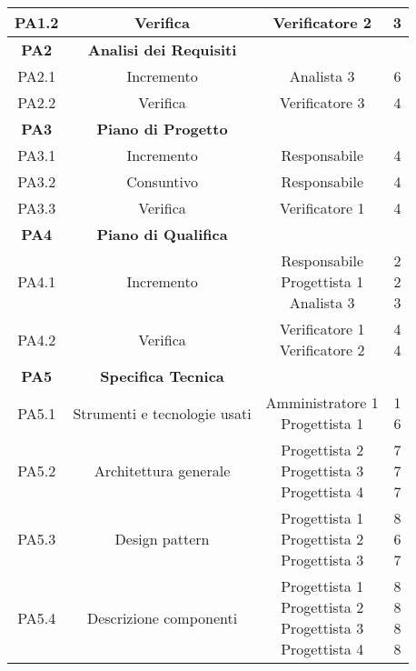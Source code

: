 \documentclass{scalatekids-article}
\begin{document}
\begin{center}
\begin{tabular}{| c | c | c | c |}
    \hline
    PA1.2 & Verifica & Verificatore 2 & 3\\
    \hline
    \textbf{PA2} & \textbf{Analisi dei Requisiti} & &\\
    \hline
    PA2.1 & Incremento & Analista 3 & 6\\
    \hline
    PA2.2 & Verifica & Verificatore 3 & 4\\
    \hline
    \textbf{PA3} & \textbf{Piano di Progetto} & &\\
    PA3.1 & Incremento & Responsabile & 4\\
    \hline
    PA3.2 & Consuntivo & Responsabile & 4\\
    \hline
    PA3.3 & Verifica & Verificatore 1 & 4\\
    \hline
    \textbf{PA4} & \textbf{Piano di Qualifica} & &\\
    \hline
    PA4.1 & Incremento & \multiLineCell[t]{Responsabile\\Progettista 1\\Analista 3} & \multiLineCell[t]{2\\2\\3}\\
    \hline
    PA4.2 & Verifica & \multiLineCell[t]{Verificatore 1\\Verificatore 2} & \multiLineCell[t]{4\\4}\\
    \hline
    \textbf{PA5} & \textbf{Specifica Tecnica} & &\\
    \hline
    PA5.1 & Strumenti e tecnologie usati & \multiLineCell[t]{Amministratore 1\\Progettista 1} & \multiLineCell[t]{1\\6}\\
    \hline
    PA5.2 & Architettura generale & \multiLineCell[t]{Progettista 2\\Progettista 3\\Progettista 4} & \multiLineCell[t]{7\\7\\7}\\
    \hline
    PA5.3 & Design pattern & \multiLineCell[t]{Progettista 1\\Progettista 2\\Progettista 3} & \multiLineCell[t]{8\\6\\7}\\
    \hline
    PA5.4 & Descrizione componenti & \multiLineCell[t]{Progettista 1\\Progettista 2\\Progettista 3\\Progettista 4} & \multiLineCell[t]{8\\8\\8\\8}\\

\end{tabular}
\end{center}
\end{document}
